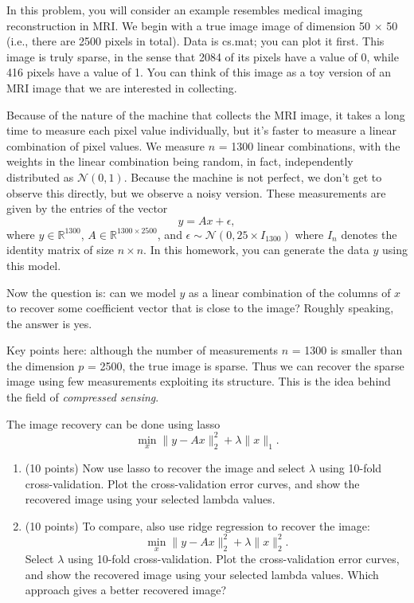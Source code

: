 \documentclass[twoside,10pt]{article}
\begin{document}
In this problem, you will consider an example resembles medical imaging reconstruction in MRI.  We begin with a true image image of dimension 50 $\times$ 50 (i.e., there are 2500 pixels in total). Data is \textsf{cs.mat}; you can plot it first. This image is truly sparse, in the sense that 2084 of its pixels have a value of 0, while 416 pixels have a value of 1. You can think of this image as a toy version of an MRI image that we are interested in collecting.

Because of the nature of the machine that collects the MRI image, it takes a long time to measure each pixel value individually, but it's faster to measure a linear combination of pixel values. We measure $n$ = 1300 linear combinations, with the weights in the linear combination being random, in fact, independently distributed as $\mathcal{N}(0,1)$. Because the machine is not perfect, we don't get to observe this directly, but we observe a noisy version. These measurements are given by the entries of the vector
\[
y = A x + \epsilon,
\]
where $y \in \mathbb R^{1300}$, $A \in \mathbb R^{1300\times 2500}$, and $\epsilon \sim \mathcal N(0, 25\times I_{1300})$ where $I_n$ denotes the identity matrix of size $n\times n$. In this homework, you can generate the data $y$ using this model. 

Now the question is: can we model $y$ as a linear combination of the columns of $x$ to recover some coefficient vector that is close to the image? Roughly speaking, the answer is yes. 

Key points here: although the number of measurements $n$ = 1300 is smaller than the dimension $p$ = 2500, the true image is sparse. Thus we can recover the sparse image using few measurements exploiting its structure. This is the idea behind the field of \textit{compressed sensing}. 

The image recovery can be done using lasso
\[
\min_x \|y-Ax\|_2^2 + \lambda \|x\|_1.
\]
\begin{enumerate}
\item (10 points) Now use lasso to recover the image and select $\lambda$ using 10-fold cross-validation. Plot the cross-validation error curves, and show the recovered image using your selected lambda values.

\item (10 points) To compare, also use ridge regression to recover the image:
\[
\min_x \|y-Ax\|_2^2 + \lambda \|x\|_2^2.
\]
Select $\lambda$ using 10-fold cross-validation. Plot the cross-validation error curves, and show the recovered image using your selected lambda values. Which approach gives a better recovered image?
\end{enumerate}
\end{document}

